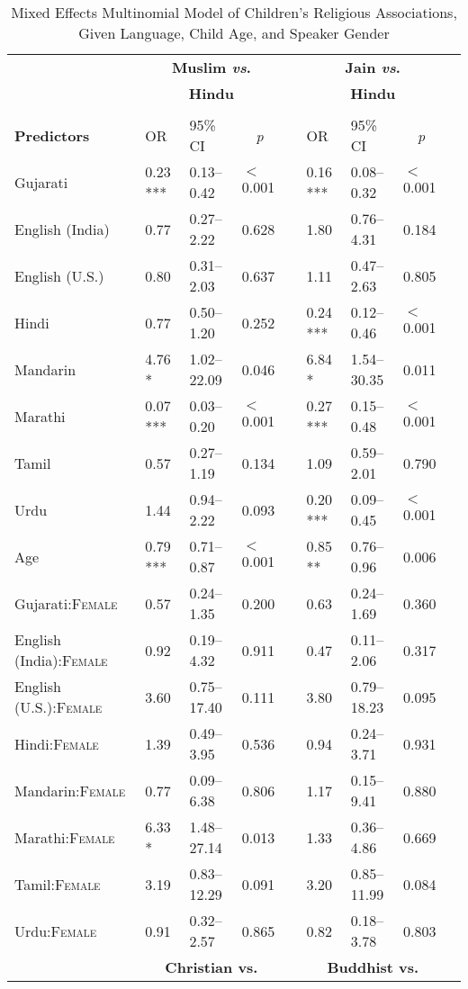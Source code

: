 \begin{table}[ht]
\small
\caption{Mixed Effects Multinomial Model of Children's Religious Associations, Given Language, Child Age, and Speaker Gender}\label{tab:rel-gender-mod}
    \centering
    \vspace{5pt}
    \setlength{\tabcolsep}{1.75pt} 
\begin{threeparttable}
\begin{tabular}{lllllllll}
\toprule
\midrule
& \multicolumn{3}{c}{\textbf{Muslim \textit{vs}.}} & & \multicolumn{3}{c}{\textbf{Jain \textit{vs}.}}\\
& \multicolumn{3}{c}{\textbf{Hindu}\tnote{a}} & & \multicolumn{3}{c}{\textbf{Hindu}\tnote{a}}\\
\cline{2-4} \cline{6-8} \\[-.75em]
\textbf{Predictors} & OR & 95\% CI & \multicolumn{1}{c}{\textit{p}} & & OR & 95\% CI & \multicolumn{1}{c}{\textit{p}} \\ 
\midrule
 Gujarati & 0.23 *** & 0.13--0.42 & $<$0.001 &  & 0.16 *** & 0.08--0.32 & $<$0.001 \\ 
 English (India) & 0.77 & 0.27--2.22 & 0.628 &  & 1.80 & 0.76--4.31 & 0.184 \\ 
 English (U.S.) & 0.80 & 0.31--2.03 & 0.637 &  & 1.11 & 0.47--2.63 & 0.805 \\ 
 Hindi & 0.77 & 0.50--1.20 & 0.252 &  & 0.24 *** & 0.12--0.46 & $<$0.001 \\ 
 Mandarin & 4.76 * & 1.02--22.09 & 0.046 &  & 6.84 * & 1.54--30.35 & 0.011 \\ 
 Marathi & 0.07 *** & 0.03--0.20 & $<$0.001 &  & 0.27 *** & 0.15--0.48 & $<$0.001 \\ 
 Tamil & 0.57 & 0.27--1.19 & 0.134 &  & 1.09 & 0.59--2.01 & 0.790 \\ 
 Urdu & 1.44 & 0.94--2.22 & 0.093 &  & 0.20 *** & 0.09--0.45 & $<$0.001 \\ 
 Age\tnote{b} & 0.79 *** & 0.71--0.87 & $<$0.001 &  & 0.85 ** & 0.76--0.96 & 0.006 \\ 
 Gujarati:\textsc{Female} & 0.57 & 0.24--1.35 & 0.200 &  & 0.63 & 0.24--1.69 & 0.360 \\ 
 English (India):\textsc{Female} & 0.92 & 0.19--4.32 & 0.911 &  & 0.47 & 0.11--2.06 & 0.317 \\ 
 English (U.S.):\textsc{Female} & 3.60 & 0.75--17.40 & 0.111 &  & 3.80 & 0.79--18.23 & 0.095 \\ 
 Hindi:\textsc{Female} & 1.39 & 0.49--3.95 & 0.536 &  & 0.94 & 0.24--3.71 & 0.931 \\ 
 Mandarin:\textsc{Female} & 0.77 & 0.09--6.38 & 0.806 &  & 1.17 & 0.15--9.41 & 0.880 \\ 
 Marathi:\textsc{Female} & 6.33 * & 1.48--27.14 & 0.013 &  & 1.33 & 0.36--4.86 & 0.669 \\ 
 Tamil:\textsc{Female} & 3.19 & 0.83--12.29 & 0.091 &  & 3.20 & 0.85--11.99 & 0.084 \\ 
 Urdu:\textsc{Female} & 0.91 & 0.32--2.57 & 0.865 &  & 0.82 & 0.18--3.78 & 0.803 \\ 
\midrule
& \multicolumn{3}{c}{\textbf{Christian vs.}} & &
\multicolumn{3}{c}{\textbf{Buddhist vs.}}\\


\end{tabular}
\end{threeparttable}
\end{table}
